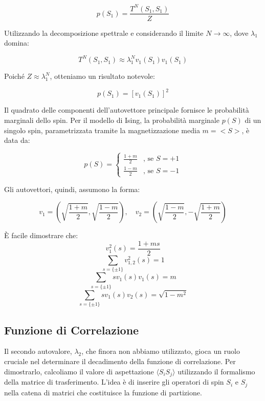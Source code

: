 \begin{equation}
p(S_1) = \frac{T^N(S_1, S_1)}{Z}
\end{equation}

Utilizzando la decomposizione spettrale e considerando il limite $N \to \infty$, dove $\lambda_1$ domina:

\begin{equation}
T^N(S_1, S_1) \approx \lambda_1^N v_1(S_1) v_1(S_1)
\end{equation}

Poiché $Z \approx \lambda_1^N$, otteniamo un risultato notevole:

\begin{equation}
p(S_1) = [v_1(S_1)]^2
\end{equation}

Il quadrato delle componenti dell'autovettore principale fornisce le probabilità marginali dello spin. 
Per il modello di Ising, la probabilità marginale $p(S)$ di un singolo spin, parametrizzata tramite la magnetizzazione media $m=<S>$, è data da:


\begin{equation}
p(S) =
\begin{cases}
\frac{1+m}{2} & \text{, se } S = +1 \\
\frac{1-m}{2} & \text{, se } S = -1
\end{cases}
\end{equation}

Gli autovettori, quindi, assumono la forma:

\begin{equation}
v_1 = \left( \sqrt{\frac{1+m}{2}}, \sqrt{\frac{1-m}{2}} \right), \quad v_2 = \left( \sqrt{\frac{1-m}{2}}, -\sqrt{\frac{1+m}{2}} \right)
\end{equation}

È facile dimostrare che:
\[v_1^2(s)=\dfrac{1+ms}{2}\]
\[\sum_{s=\{\pm1\}}v_{1,2}^2(s)=1\]
\begin{equation}\label{eqn:1}
    \sum_{s=\{\pm1\}}sv_1(s)v_1(s)=m
\end{equation}
\begin{equation}\label{eqn:2}
    \sum_{s=\{\pm1\}}sv_1(s)v_2(s)=\sqrt{1-m^2}
\end{equation}

\subsection{Funzione di Correlazione}

Il secondo autovalore, $\lambda_2$, che finora non abbiamo utilizzato, gioca un ruolo cruciale nel determinare il decadimento della funzione di correlazione. Per dimostrarlo, calcoliamo il valore di aspettazione $\langle S_i S_j \rangle$ utilizzando il formalismo della matrice di trasferimento. L'idea è di inserire gli operatori di spin $S_i$ e $S_j$ nella catena di matrici che costituisce la funzione di partizione.


